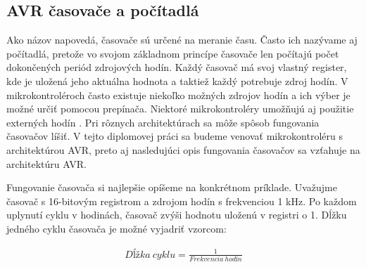 \setcounter{tocdepth}{4}
\setcounter{secnumdepth}{4}

\subsection{AVR časovače a počítadlá}
\noindent

Ako názov napovedá, časovače sú určené na meranie času. Často ich nazývame aj počítadlá,
pretože vo svojom základnom princípe časovače len počítajú počet dokončených periód zdrojových hodín.
Každý časovač má svoj vlastný register, kde je uložená jeho aktuálna hodnota a taktiež každý potrebuje zdroj hodín. V mikrokontroléroch často existuje niekoľko možných zdrojov
hodín a ich výber je možné určiť pomocou prepínača. Niektoré mikrokontroléry umožňujú aj použitie
externých hodín \cite{IntroductionMicrocontrollerTimers}. Pri rôznych architektúrach sa môže spôsob fungovania časovačov líšiť. V tejto diplomovej práci sa budeme venovať
mikrokontroléru s architektúrou AVR, preto aj nasledujúci opis fungovania časovačov sa vzťahuje na architektúru AVR.\par
Fungovanie časovača si najlepšie opíšeme na konkrétnom príklade.
Uvažujme časovač s 16-bitovým registrom a zdrojom hodín s frekvenciou 1 kHz. Po každom uplynutí cyklu v hodinách, časovač
zvýši hodnotu uloženú v registri o 1. Dĺžku jedného cyklu časovača je možné vyjadriť vzorcom:

\begin{equation}
    \begin{aligned}
        Dĺžka\:cyklu = \frac{1}{Frekvencia\:hodín}
    \end{aligned}
\end{equation}

